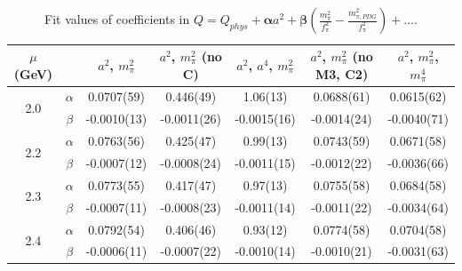 \documentclass[12pt]{extarticle}
\begin{document}
\begin{table}[h!]
\begin{center}
\begin{tabular}{|c c|c|c|c|c|c|}
\hline
$\mu$ (GeV) &  & $a^2$, $m_\pi^2$& $a^2$, $m_\pi^2$ (no C)& $a^2$, $a^4$, $m_\pi^2$& $a^2$, $m_\pi^2$ (no M3, C2)& $a^2$, $m_\pi^2$, $m_\pi^4$\\
\hline
\multirow{2}{0.5in}{2.0} & $\alpha$ & 0.0707(59)& 0.446(49)& 1.06(13)& 0.0688(61)& 0.0615(62)\\
 & $\beta$ & -0.0010(13)& -0.0011(26)& -0.0015(16)& -0.0014(24)& -0.0040(71)\\
\hline
\multirow{2}{0.5in}{2.2} & $\alpha$ & 0.0763(56)& 0.425(47)& 0.99(13)& 0.0743(59)& 0.0671(58)\\
 & $\beta$ & -0.0007(12)& -0.0008(24)& -0.0011(15)& -0.0012(22)& -0.0036(66)\\
\hline
\multirow{2}{0.5in}{2.3} & $\alpha$ & 0.0773(55)& 0.417(47)& 0.97(13)& 0.0755(58)& 0.0684(58)\\
 & $\beta$ & -0.0007(11)& -0.0008(23)& -0.0011(14)& -0.0011(22)& -0.0034(64)\\
\hline
\multirow{2}{0.5in}{2.4} & $\alpha$ & 0.0792(54)& 0.406(46)& 0.93(12)& 0.0774(58)& 0.0704(58)\\
 & $\beta$ & -0.0006(11)& -0.0007(22)& -0.0010(14)& -0.0010(21)& -0.0031(63)\\
\hline
\end{tabular}
\caption{Fit values of coefficients in $Q = Q_{phys} + \mathbf{\alpha} a^2 + \mathbf{\beta}\left(\frac{m_\pi^2}{f_\pi^2}-\frac{m_{\pi,PDG}^2}{f_\pi^2}\right) + \ldots$.}
\end{center}
\end{table}




















\clearpage
\end{document}
